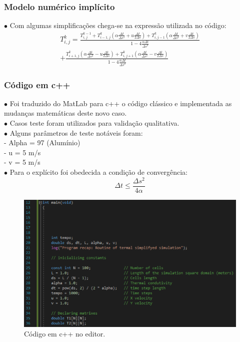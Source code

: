 \documentclass[xcolor=dvipsnames,10pt,aspectratio=169]{beamer}
\begin{document}
	\begin{frame} 
		\frametitle{Modelo numérico implícito}
		$\bullet$ Com algumas simplificações chega-se na expressão utilizada no código:
		\begin{equation}
			\begin{split}
			T_{i,j}^{k} = \frac{T_{i,j}^{k-1} + T_{i -1, j}^{k} \left( \alpha \frac{\Delta t}{\Delta s^2} + u \frac{\Delta t}{2 \Delta s} \right) 	+ T_{i,j-1}^{k} \left( \alpha \frac{\Delta t}{\Delta s^2} + v \frac{\Delta t}{2 \Delta s} \right)}{ 1 - 4 \frac{\alpha \Delta t}{\Delta s ^2}} \\
			+ \frac{  T_{i+1,j}^{k} \left( \alpha \frac{\Delta t}{ \Delta s^2} - u \frac{\Delta t}{2 \Delta s}\right) 
			+  T_{i,j+1}^{k} \left( \alpha \frac{\Delta t}{\Delta s^2} - v \frac{\Delta t}{2 \Delta s}\right)}{ 1 - 4 \frac{\alpha \Delta t}{\Delta s ^2}}
			\end{split}
		\end{equation}
	\end{frame}




	\begin{frame} 
		\frametitle{Código em c++}
		\begin{minipage}[h!]{0.49\textwidth}
			$\bullet$ Foi traduzido do MatLab para c++ o código clássico e implementada as mudanças matemáticas deste novo caso.\\
			$\bullet$ Casos teste foram utilizados para validação qualitativa.\\
			$\bullet$ Alguns parâmetros de teste notáveis foram: \\
			- Alpha = 97 (Alumínio) \\
			- u = 5 m/s \\
			- v = 5 m/s \\
			$\bullet$ Para o explícito foi obedecida a condição de convergência:
			\begin{equation}
				\Delta t \leq \frac{\Delta s ^2}{4 \alpha} 
			\end{equation}
		\end{minipage}
		\begin{minipage}[h!]{0.49\textwidth}
			\begin{figure}[h!]
				\centering
				\includegraphics[trim = {0cm 1cm 5cm 1cm}, clip , angle=0, scale=0.65]{images/printCodigo1}
				\caption{Código em c++ no editor.}
			\end{figure}
		\end{minipage}
	\end{frame}
	
\end{document}
